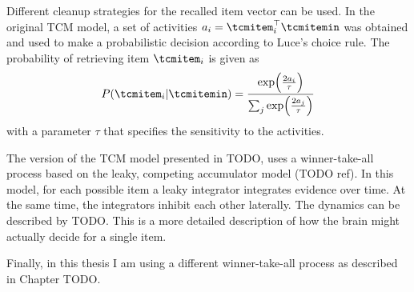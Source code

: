 Different cleanup strategies for the recalled item vector can be used.
In the original TCM model, a set of activities $a_i = \tcmitem_i\Tr \tcmitemin$ was obtained and used to make a probabilistic decision according to Luce's choice rule.
The probability of retrieving item $\tcmitem_i$ is given as
\begin{equation}
    P(\tcmitem_i | \tcmitemin) = \frac{\exp\!\del{\frac{2a_i}{\tau}}}{\sum_j \exp\!\del{\frac{2a_j}{\tau}}}
\end{equation}
with a parameter $\tau$ that specifies the sensitivity to the activities.

The version of the TCM model presented in TODO, uses a winner-take-all process based on the leaky, competing accumulator model (TODO ref).
In this model, for each possible item a leaky integrator integrates evidence over time.
At the same time, the integrators inhibit each other laterally.
The dynamics can be described by TODO\@.
This is a more detailed description of how the brain might actually decide for a single item.

Finally, in this thesis I am using a different winner-take-all process as described in Chapter TODO\@.
